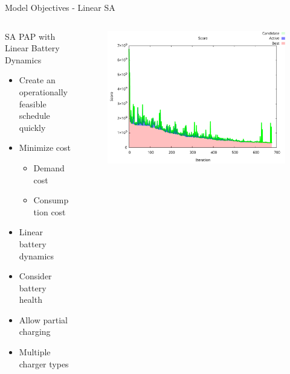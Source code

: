 \documentclass[aspectratio=169,dvipsnames]{beamer}
\begin{document}
\begin{frame}[label={sec:org978bc39}]{Model Objectives - Linear SA}
\begin{columns}
\begin{column}{0.5\columnwidth}
\begin{exampleblock}{SA PAP with Linear Battery Dynamics}
{\footnotesize
\begin{itemize}
\item Create an operationally feasible schedule quickly
\item Minimize cost
\begin{itemize}
\item Demand cost
\item Consumption cost
\end{itemize}
\item Linear battery dynamics
\item Consider battery health
\item Allow partial charging
\item Multiple charger types
\end{itemize}
}
\end{exampleblock}
\end{column}

\begin{column}{0.5\columnwidth}
\begin{figure}[htpb]
\centering
    \includegraphics[width=\textwidth]{img/score-convergence}
\end{figure}
\end{column}
\end{columns}
\end{frame}
\end{document}
